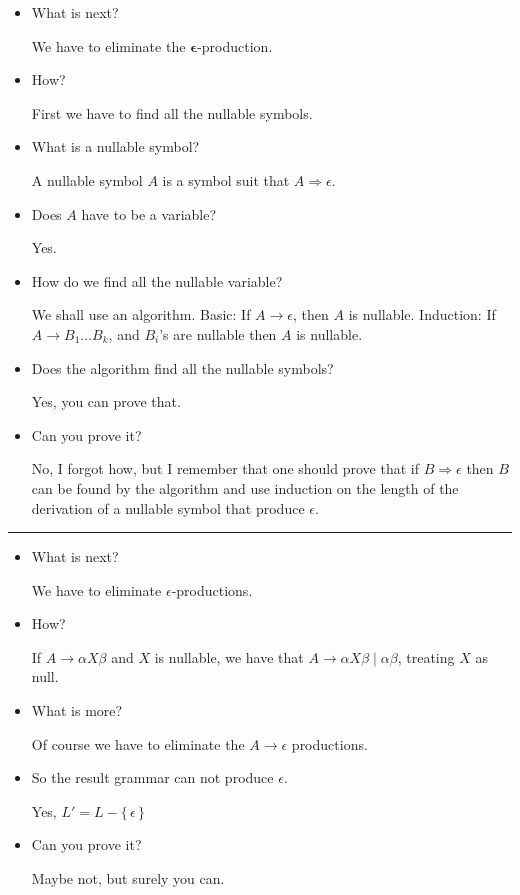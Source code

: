 \documentclass[../main.tex]{subfiles}
\begin{document}
\begin{itemize}
\item What is next? 

		We have to eliminate the \(\boldsymbol{\epsilon}\)-production. 
\item How? 

		First we have to find all the nullable symbols.
\item What is a nullable symbol? 

		A nullable symbol \(A\) is a symbol suit that \(A \Rightarrow\epsilon\). 
\item Does \(A\) have to be a variable? 

		Yes. 
\item How do we find all the nullable variable? 

		We shall use an algorithm. Basic: If \( A \to\epsilon\), then \(A\) is nullable. Induction: If \(A \to B_1 \dots B_{k}\), and \(B_{i}\)'s are nullable then \(A\) is nullable.

\item Does the algorithm find all the nullable symbols? 

	Yes, you can prove that. 

\item Can you prove it?

	No, I forgot how, but I remember that 
	one should prove that 
	if \( B \Rightarrow\epsilon\) then \(B\) can be found by the algorithm and use 
	induction on the length of the derivation of a nullable symbol that produce \(\epsilon\).
\end{itemize}

\hrule 

\begin{itemize}
\item What is next? 

We have to eliminate \(\epsilon\)-productions.

\item How? 

If \(A \to\alpha X\beta\) and \(X\) is nullable, we have that 
\(A \to\alpha X\beta \mid\alpha\beta\), treating \(X\) as null. 

\item What is more? 

Of course we have to eliminate the \( A \to\epsilon\) productions.

\item So the result grammar can not produce \(\epsilon\). 

Yes, \(L' = L - \{ \,\epsilon \, \}\) 

\item Can you prove it? 

Maybe not, but surely you can. 
\end{itemize}
\end{document}
